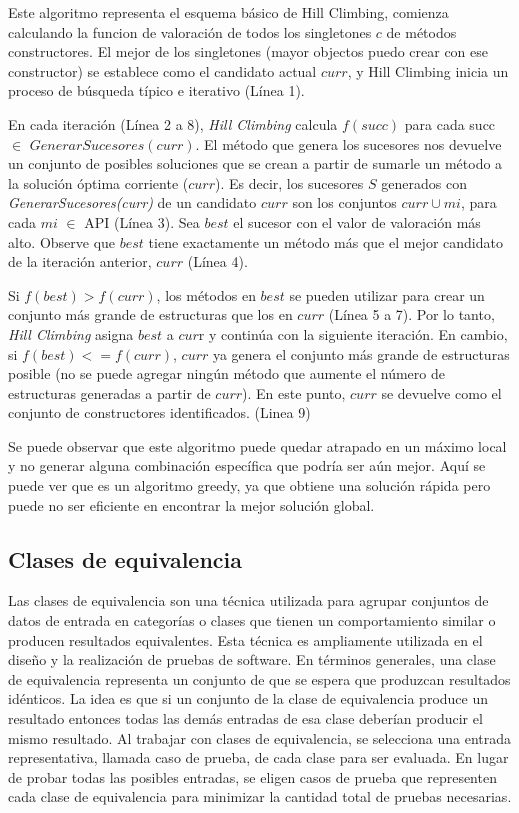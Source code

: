 Este algoritmo representa el esquema básico de Hill Climbing, comienza calculando la funcion de valoración de todos los singletones ${c}$ de métodos constructores.  El mejor de los singletones (mayor objectos puedo crear con ese constructor) se establece como el candidato actual $curr$, y Hill Climbing inicia un proceso de búsqueda típico e iterativo (Línea 1).

En cada iteración (Línea 2 a 8), \emph{Hill Climbing} calcula $f(succ)$ para cada succ $\in$ $GenerarSucesores(curr)$. El método que genera los sucesores nos devuelve un conjunto de posibles soluciones que se crean a partir de sumarle un método a la solución óptima corriente ($curr$). Es decir, los sucesores  $S$ generados con \emph{GenerarSucesores(curr)} de un candidato $curr$ son los conjuntos {$curr\cup{mi}$}, para cada $mi$ $\in$ API (Línea 3).
Sea $best$ el sucesor con el valor de valoración más alto. Observe que $best$ tiene exactamente un método más que el mejor candidato de la iteración anterior, $curr$ (Línea 4).

Si $f(best) > f(curr)$, los métodos en $best$ se pueden utilizar para crear un conjunto más grande de estructuras que los en $curr$ (Línea 5 a 7). Por lo tanto, \emph{Hill Climbing} asigna $best$ a $cur$r y continúa con la siguiente iteración. En cambio, si $f(best) <= f(curr)$, $curr$ ya genera el conjunto más grande de estructuras posible (no se puede agregar ningún método que aumente el número de estructuras generadas a partir de $curr$). En este punto, $curr$ se devuelve como el conjunto de constructores identificados. (Linea 9) 


Se puede observar que este algoritmo puede quedar atrapado en un máximo local y no generar alguna combinación específica que podría ser aún mejor. Aquí se puede ver que es un algoritmo greedy, ya que obtiene una solución rápida pero puede no ser eficiente en encontrar la mejor solución global. 


\subsection{Clases de equivalencia}
\label{alg:approachCE}
 Las clases de equivalencia son una técnica utilizada para agrupar conjuntos de datos de entrada en categorías o clases que tienen un comportamiento similar o producen resultados equivalentes. Esta técnica es ampliamente utilizada en el diseño y la realización de pruebas de software.
 En términos generales, una clase de equivalencia representa  un conjunto de que se espera que produzcan resultados idénticos. La idea es que si un conjunto de la clase de equivalencia produce un resultado entonces todas las demás entradas de esa clase deberían producir el mismo resultado.
 Al trabajar con clases de equivalencia, se selecciona una entrada representativa, llamada caso de prueba, de cada clase para ser evaluada. En lugar de probar todas las posibles entradas, se eligen casos de prueba que representen cada clase de equivalencia para minimizar la cantidad total de pruebas necesarias.

